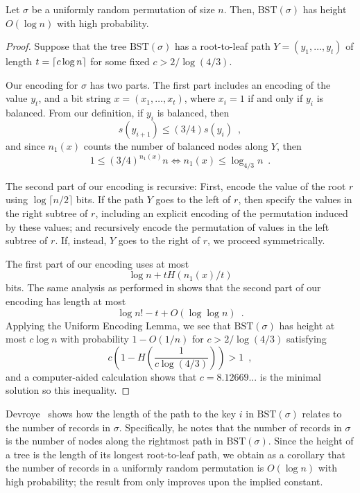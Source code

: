 \documentclass{patmorin}
\begin{document}
\begin{thm}
  Let $\sigma$ be a uniformly random permutation of size $n$. Then,
  $\text{BST}(\sigma)$ has height $O(\log n)$ with high probability.
\end{thm}
\begin{proof}
  Suppose that the tree $\text{BST}(\sigma)$ has a root-to-leaf path
  $Y = (y_1, \ldots, y_t)$ of length $t = {\lceil c \log n \rceil}$ for some
  fixed $c > 2/\log (4/3)$.

  Our encoding for $\sigma$ has two parts. The first part includes an
  encoding of the value $y_t$, and a bit string $x = (x_1, \ldots,
  x_t)$, where $x_i = 1$ if and only if $y_i$ is balanced. From our
  definition, if $y_i$ is balanced, then
  \[
    s(y_{i + 1}) \leq (3/4) s(y_i) \enspace ,
  \]
  and since $n_1(x)$ counts the number of balanced nodes along $Y$,
  then
  \[
    1 \leq (3/4)^{n_1(x)} n \iff n_1(x) \leq \log_{4/3} n \enspace .
  \]

  The second part of our encoding is recursive: First, encode the
  value of the root $r$ using $\log \lceil n/2 \rceil$ bits. If the
  path $Y$ goes to the left of $r$, then specify the values in the
  right subtree of $r$, including an explicit encoding of the
  permutation induced by these values; and recursively encode the
  permutation of values in the left subtree of $r$. If, instead, $Y$
  goes to the right of $r$, we proceed symmetrically.
 
  The first part of our encoding uses at most
  \[
    \log n + t H(n_1(x)/t)
  \]
  bits. The same analysis as performed in  shows that
  the second part of our encoding has length at most
  \[
    \log n! - t + O(\log \log n) \enspace .
  \]
  Applying the Uniform Encoding Lemma, we see that
  $\text{BST}(\sigma)$ has height at most $c \log n$ with probability
  $1 - O(1/n)$ for $c > 2/\log (4/3)$ satisfying
  \[
    c \left(1 - H\left(\frac{1}{c \log (4/3)}\right)\right) > 1 \enspace ,
  \]
  and a computer-aided calculation shows that $c = 8.12669...$ is the
  minimal solution so this inequality.
\end{proof}

\begin{rem}
  Devroye~\cite{devroye:records} shows how the length of the path to
  the key $i$ in $\text{BST}(\sigma)$ relates to the number of records
  in $\sigma$. Specifically, he notes that the number of records in
  $\sigma$ is the number of nodes along the rightmost path in
  $\text{BST}(\sigma)$. Since the height of a tree is the length of
  its longest root-to-leaf path, we obtain as a corollary that the
  number of records in a uniformly random permutation is $O(\log n)$
  with high probability; the result from  only
  improves upon the implied constant.
\end{rem}
\end{document}
